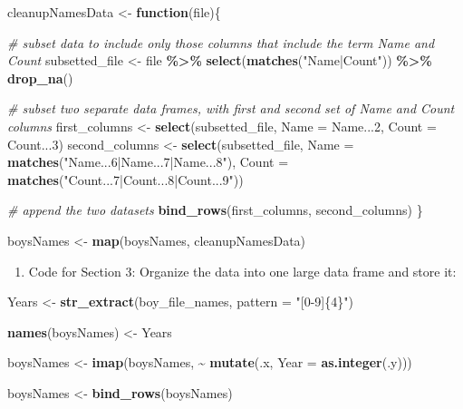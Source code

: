 \documentclass[
]{book}
\newenvironment{Shaded}{\begin{snugshade}}{\end{snugshade}}
\newcommand{\CommentTok}[1]{\textcolor[rgb]{0.56,0.35,0.01}{\textit{#1}}}
\newcommand{\ControlFlowTok}[1]{\textcolor[rgb]{0.13,0.29,0.53}{\textbf{#1}}}
\newcommand{\DataTypeTok}[1]{\textcolor[rgb]{0.13,0.29,0.53}{#1}}
\newcommand{\DecValTok}[1]{\textcolor[rgb]{0.00,0.00,0.81}{#1}}
\newcommand{\KeywordTok}[1]{\textcolor[rgb]{0.13,0.29,0.53}{\textbf{#1}}}
\newcommand{\NormalTok}[1]{#1}
\newcommand{\OperatorTok}[1]{\textcolor[rgb]{0.81,0.36,0.00}{\textbf{#1}}}
\newcommand{\StringTok}[1]{\textcolor[rgb]{0.31,0.60,0.02}{#1}}
\providecommand{\tightlist}{%
  \setlength{\itemsep}{0pt}\setlength{\parskip}{0pt}}
\begin{document}
\begin{Shaded}
\begin{Highlighting}[]
\NormalTok{cleanupNamesData \textless{}{-}}\StringTok{ }\ControlFlowTok{function}\NormalTok{(file)\{}
  
  \CommentTok{\# subset data to include only those columns that include the term \textasciigrave{}Name\textasciigrave{} and \textasciigrave{}Count\textasciigrave{}}
\NormalTok{  subsetted\_file \textless{}{-}}\StringTok{ }\NormalTok{file }\OperatorTok{\%\textgreater{}\%}
\StringTok{    }\KeywordTok{select}\NormalTok{(}\KeywordTok{matches}\NormalTok{(}\StringTok{"Name|Count"}\NormalTok{)) }\OperatorTok{\%\textgreater{}\%}
\StringTok{    }\KeywordTok{drop\_na}\NormalTok{()}

  \CommentTok{\# subset two separate data frames, with first and second set of \textasciigrave{}Name\textasciigrave{} and \textasciigrave{}Count\textasciigrave{} columns }
\NormalTok{  first\_columns \textless{}{-}}\StringTok{ }\KeywordTok{select}\NormalTok{(subsetted\_file, }\DataTypeTok{Name =}\NormalTok{ Name...}\DecValTok{2}\NormalTok{, }\DataTypeTok{Count =}\NormalTok{ Count...}\DecValTok{3}\NormalTok{) }
\NormalTok{  second\_columns \textless{}{-}}\StringTok{ }\KeywordTok{select}\NormalTok{(subsetted\_file, }\DataTypeTok{Name =} \KeywordTok{matches}\NormalTok{(}\StringTok{"Name...6|Name...7|Name...8"}\NormalTok{),}
                                           \DataTypeTok{Count =} \KeywordTok{matches}\NormalTok{(}\StringTok{"Count...7|Count...8|Count...9"}\NormalTok{))}

  \CommentTok{\# append the two datasets}
  \KeywordTok{bind\_rows}\NormalTok{(first\_columns, second\_columns)}
\NormalTok{\}}

\NormalTok{boysNames \textless{}{-}}\StringTok{ }\KeywordTok{map}\NormalTok{(boysNames, cleanupNamesData)}
\end{Highlighting}
\end{Shaded}

\begin{enumerate}
\def\labelenumi{\arabic{enumi}.}
\setcounter{enumi}{2}
\tightlist
\item
  Code for Section 3: Organize the data into one large data frame and store it:
\end{enumerate}

\begin{Shaded}
\begin{Highlighting}[]
\NormalTok{Years \textless{}{-}}\StringTok{ }\KeywordTok{str\_extract}\NormalTok{(boy\_file\_names, }\DataTypeTok{pattern =} \StringTok{"[0{-}9]\{4\}"}\NormalTok{)}

\KeywordTok{names}\NormalTok{(boysNames) \textless{}{-}}\StringTok{ }\NormalTok{Years}

\NormalTok{boysNames \textless{}{-}}\StringTok{ }\KeywordTok{imap}\NormalTok{(boysNames, }\OperatorTok{\textasciitilde{}}\StringTok{ }\KeywordTok{mutate}\NormalTok{(.x, }\DataTypeTok{Year =} \KeywordTok{as.integer}\NormalTok{(.y)))}

\NormalTok{boysNames \textless{}{-}}\StringTok{ }\KeywordTok{bind\_rows}\NormalTok{(boysNames)}
\end{Highlighting}
\end{Shaded}
\end{document}
